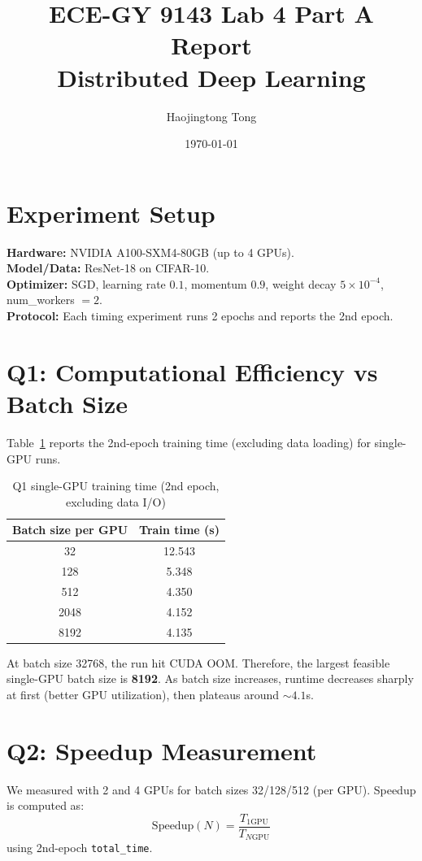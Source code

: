 \documentclass[11pt]{article}
\title{ECE-GY 9143 Lab 4 Part A Report\\Distributed Deep Learning}
\author{Haojingtong Tong}
\date{\today}
\begin{document}
\maketitle

\section{Experiment Setup}
\textbf{Hardware:} NVIDIA A100-SXM4-80GB (up to 4 GPUs).\\
\textbf{Model/Data:} ResNet-18 on CIFAR-10.\\
\textbf{Optimizer:} SGD, learning rate $0.1$, momentum $0.9$, weight decay $5\times 10^{-4}$, num\_workers $=2$.\\
\textbf{Protocol:} Each timing experiment runs 2 epochs and reports the 2nd epoch.

\section{Q1: Computational Efficiency vs Batch Size}
Table~\ref{tab:q1} reports the 2nd-epoch training time (excluding data loading) for single-GPU runs.

\begin{table}[h]
\centering
\caption{Q1 single-GPU training time (2nd epoch, excluding data I/O)}
\label{tab:q1}
\begin{tabular}{cc}
\toprule
Batch size per GPU & Train time (s) \\
\midrule
32   & 12.543 \\
128  & 5.348 \\
512  & 4.350 \\
2048 & 4.152 \\
8192 & 4.135 \\
\bottomrule
\end{tabular}
\end{table}

At batch size 32768, the run hit CUDA OOM. Therefore, the largest feasible single-GPU batch size is \textbf{8192}.  
As batch size increases, runtime decreases sharply at first (better GPU utilization), then plateaus around $\sim 4.1$s.

\section{Q2: Speedup Measurement}
We measured with 2 and 4 GPUs for batch sizes 32/128/512 (per GPU).  
Speedup is computed as:
\[
\text{Speedup}(N)=\frac{T_{1\text{GPU}}}{T_{N\text{GPU}}}
\]
using 2nd-epoch \texttt{total\_time}.
\end{document}

